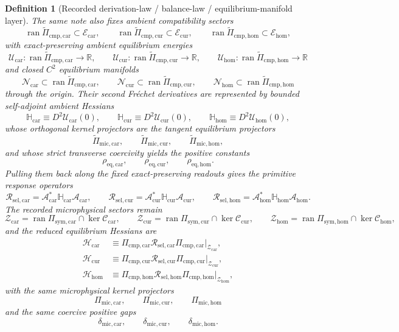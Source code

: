 \documentclass[11pt]{article}
\newcommand{\UltraTensorClass}{\mathscr Z_{\mathrm{car}}}
\newcommand{\UltraRelabelClass}{\mathscr Z_{\mathrm{cur}}}
\newcommand{\UltraFreeClass}{\mathscr Z_{\mathrm{hom}}}
\newcommand{\UltraCarProj}{\Pi_{\mathrm{mic,car}}}
\newcommand{\UltraCurProj}{\Pi_{\mathrm{mic,cur}}}
\newcommand{\UltraHomProj}{\Pi_{\mathrm{mic,hom}}}
\newcommand{\UltraCarGap}{\delta_{\mathrm{mic,car}}}
\newcommand{\UltraCurGap}{\delta_{\mathrm{mic,cur}}}
\newcommand{\UltraHomGap}{\delta_{\mathrm{mic,hom}}}
\newcommand{\TensorSymProj}{\Pi_{\mathrm{sym,car}}}
\newcommand{\CurSymProj}{\Pi_{\mathrm{sym,cur}}}
\newcommand{\HomSymProj}{\Pi_{\mathrm{sym,hom}}}
\newcommand{\TensorCompat}{\mathcal C_{\mathrm{car}}}
\newcommand{\CurCompat}{\mathcal C_{\mathrm{cur}}}
\newcommand{\HomCompat}{\mathcal C_{\mathrm{hom}}}
\newcommand{\TensorHess}{\mathcal H_{\mathrm{car}}}
\newcommand{\CurHess}{\mathcal H_{\mathrm{cur}}}
\newcommand{\HomHess}{\mathcal H_{\mathrm{hom}}}
\newcommand{\TensorCmpProj}{\Pi_{\mathrm{cmp,car}}}
\newcommand{\CurCmpProj}{\Pi_{\mathrm{cmp,cur}}}
\newcommand{\HomCmpProj}{\Pi_{\mathrm{cmp,hom}}}
\newcommand{\TensorResp}{\mathcal R_{\mathrm{sel,car}}}
\newcommand{\CurResp}{\mathcal R_{\mathrm{sel,cur}}}
\newcommand{\HomResp}{\mathcal R_{\mathrm{sel,hom}}}
\newcommand{\TensorEqClass}{\mathscr E_{\mathrm{car}}}
\newcommand{\CurEqClass}{\mathscr E_{\mathrm{cur}}}
\newcommand{\HomEqClass}{\mathscr E_{\mathrm{hom}}}
\newcommand{\TensorEqRead}{\mathcal A_{\mathrm{car}}}
\newcommand{\CurEqRead}{\mathcal A_{\mathrm{cur}}}
\newcommand{\HomEqRead}{\mathcal A_{\mathrm{hom}}}
\newcommand{\TensorAmbientHess}{\mathbb H_{\mathrm{car}}}
\newcommand{\CurAmbientHess}{\mathbb H_{\mathrm{cur}}}
\newcommand{\HomAmbientHess}{\mathbb H_{\mathrm{hom}}}
\newcommand{\TensorEqCmpProj}{\widetilde\Pi_{\mathrm{cmp,car}}}
\newcommand{\CurEqCmpProj}{\widetilde\Pi_{\mathrm{cmp,cur}}}
\newcommand{\HomEqCmpProj}{\widetilde\Pi_{\mathrm{cmp,hom}}}
\newcommand{\TensorEqKerProj}{\widetilde\Pi_{\mathrm{mic,car}}}
\newcommand{\CurEqKerProj}{\widetilde\Pi_{\mathrm{mic,cur}}}
\newcommand{\HomEqKerProj}{\widetilde\Pi_{\mathrm{mic,hom}}}
\newcommand{\EqCarGap}{\rho_{\mathrm{eq,car}}}
\newcommand{\EqCurGap}{\rho_{\mathrm{eq,cur}}}
\newcommand{\EqHomGap}{\rho_{\mathrm{eq,hom}}}
\newcommand{\TensorAmbientEnergy}{\mathcal U_{\mathrm{car}}}
\newcommand{\CurAmbientEnergy}{\mathcal U_{\mathrm{cur}}}
\newcommand{\HomAmbientEnergy}{\mathcal U_{\mathrm{hom}}}
\newcommand{\TensorEqManifold}{\mathcal N_{\mathrm{car}}}
\newcommand{\CurEqManifold}{\mathcal N_{\mathrm{cur}}}
\newcommand{\HomEqManifold}{\mathcal N_{\mathrm{hom}}}
\newtheorem{definition}{Definition}
\begin{document}
\begin{definition}[Recorded derivation-law / balance-law / equilibrium-manifold layer]
The same note also fixes ambient compatibility sectors
\[
\operatorname{ran}\TensorEqCmpProj\subset\TensorEqClass,\qquad
\operatorname{ran}\CurEqCmpProj\subset\CurEqClass,\qquad
\operatorname{ran}\HomEqCmpProj\subset\HomEqClass,
\]
with exact-preserving ambient equilibrium energies
\[
\TensorAmbientEnergy:\operatorname{ran}\TensorEqCmpProj\to\mathbb R,\qquad
\CurAmbientEnergy:\operatorname{ran}\CurEqCmpProj\to\mathbb R,\qquad
\HomAmbientEnergy:\operatorname{ran}\HomEqCmpProj\to\mathbb R
\]
and closed \(C^2\) equilibrium manifolds
\[
\TensorEqManifold\subset\operatorname{ran}\TensorEqCmpProj,\qquad
\CurEqManifold\subset\operatorname{ran}\CurEqCmpProj,\qquad
\HomEqManifold\subset\operatorname{ran}\HomEqCmpProj
\]
through the origin. Their second Fr\'echet derivatives are represented by bounded self-adjoint ambient Hessians
\begin{equation}
\TensorAmbientHess\equiv D^2\TensorAmbientEnergy(0),\qquad
\CurAmbientHess\equiv D^2\CurAmbientEnergy(0),\qquad
\HomAmbientHess\equiv D^2\HomAmbientEnergy(0),
\label{eq:recorded_ambient_hessians}
\end{equation}
whose orthogonal kernel projectors are the tangent equilibrium projectors
\[
\TensorEqKerProj,\qquad
\CurEqKerProj,\qquad
\HomEqKerProj,
\]
and whose strict transverse coercivity yields the positive constants
\[
\EqCarGap,\qquad
\EqCurGap,\qquad
\EqHomGap.
\]
Pulling them back along the fixed exact-preserving readouts gives the primitive response operators
\begin{equation}
\TensorResp=\TensorEqRead^*\TensorAmbientHess\TensorEqRead,\qquad
\CurResp=\CurEqRead^*\CurAmbientHess\CurEqRead,\qquad
\HomResp=\HomEqRead^*\HomAmbientHess\HomEqRead.
\label{eq:recorded_response_from_ambient}
\end{equation}
The recorded microphysical sectors remain
\begin{equation}
\UltraTensorClass=\operatorname{ran}\TensorSymProj\cap\ker\TensorCompat,
\qquad
\UltraRelabelClass=\operatorname{ran}\CurSymProj\cap\ker\CurCompat,
\qquad
\UltraFreeClass=\operatorname{ran}\HomSymProj\cap\ker\HomCompat,
\label{eq:recorded_ultra}
\end{equation}
and the reduced equilibrium Hessians are
\begin{equation}
\begin{aligned}
\TensorHess
&\equiv
\TensorCmpProj\TensorResp\TensorCmpProj\big|_{\UltraTensorClass},
\\
\CurHess
&\equiv
\CurCmpProj\CurResp\CurCmpProj\big|_{\UltraRelabelClass},
\\
\HomHess
&\equiv
\HomCmpProj\HomResp\HomCmpProj\big|_{\UltraFreeClass},
\end{aligned}
\label{eq:recorded_hessians}
\end{equation}
with the same microphysical kernel projectors
\[
\UltraCarProj,\qquad
\UltraCurProj,\qquad
\UltraHomProj
\]
and the same coercive positive gaps
\[
\UltraCarGap,\qquad
\UltraCurGap,\qquad
\UltraHomGap.
\]
\end{definition}
\end{document}
